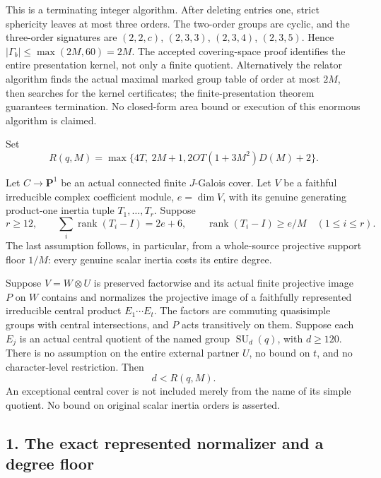 This is a terminating integer algorithm. After deleting entries one,
strict sphericity leaves at most three orders. The two-order groups are
cyclic, and the three-order signatures are \((2,2,c)\),
\((2,3,3)\), \((2,3,4)\), \((2,3,5)\). Hence
\(|\Gamma_b|\le\max(2M,60)=2M\). The accepted covering-space proof
identifies the entire presentation kernel, not only a finite quotient.
Alternatively the relator algorithm finds the actual maximal marked
group table of order at most \(2M\), then searches for the kernel
certificates; the finite-presentation theorem guarantees termination.
No closed-form area bound or execution of this enormous algorithm is
claimed.

Set
\[
 R(q,M)=\max\{4T,\ 2M+1,
                 2OT(1+3M^2)D(M)+2\}.
 \tag{UAR.3}
\]

\begin{theorem}[D-TD69]
Let \(C\to\mathbf P^1\) be an actual connected finite \(J\)-Galois
cover. Let \(V\) be a faithful irreducible complex coefficient module,
\(e=\dim V\), with its genuine generating product-one inertia tuple
\(T_1,\ldots,T_r\). Suppose
\[
 r\ge12,\qquad \sum_i\operatorname{rank}(T_i-I)=2e+6,
 \qquad \operatorname{rank}(T_i-I)\ge e/M\quad(1\le i\le r).
 \tag{UAR.4}
\]
The last assumption follows, in particular, from a whole-source
projective support floor \(1/M\): every genuine scalar inertia costs
its entire degree.

Suppose \(V=W\otimes U\) is preserved factorwise and its actual finite
projective image \(P\) on \(W\) contains and normalizes the projective
image of a faithfully represented irreducible central product \(E_1\cdots E_t\).
The factors are commuting quasisimple groups with central
intersections, and \(P\) acts transitively on them. Suppose each
\(E_j\) is an actual central quotient of the named group
\(\operatorname{SU}_d(q)\), with \(d\ge120\).
There is no assumption on the entire external partner \(U\), no
bound on \(t\), and no character-level restriction. Then
\[
                              d<R(q,M).
 \tag{UAR.5}
\]
An exceptional central cover is not included merely from the name of
its simple quotient. No bound on original scalar inertia orders is
asserted.
\end{theorem}

\subsection*{1. The exact represented normalizer and a degree floor}

